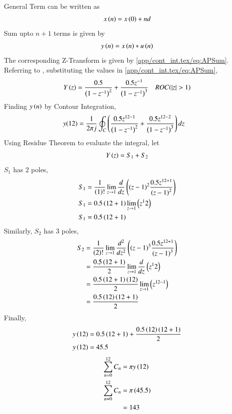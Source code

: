 \documentclass[journal,12pt,twocolumn]{IEEEtran}
\theoremstyle{remark}
\begin{document}
General Term can be written as 
\begin{align}
    x\left(n\right) = x\left(0\right) + nd
\end{align}
Sum upto $n + 1$ terms is given by
\begin{align}
    y\left(n\right) = x\left(n\right)*u\left(n\right)
\end{align}
The corresponding Z-Transform is given by \eqref{app/cont_int.tex/eq:APSum}.
Referring to , substituting the values in \eqref{app/cont_int.tex/eq:APSum}, 
\begin{align}
    Y\left(z\right) = \frac{0.5}{\left(1 - z^{-1}\right)^2} + \frac{0.5z^{-1}}{\left(1-z^{-1}\right)^3} \quad ROC(\left\vert z\right\vert > 1)
\end{align}
Finding $y\left(n\right)$ by Contour Integration, 
\begin{align}
     y(12)&=\frac{1}{2\pi j}\oint_{C}\left(\dfrac{0.5z^{12-1}}{\left(1-z^{-1}\right)^2} + \dfrac{0.5z^{12-2}}{\left(1-z^{-1}\right)^{3}}\right)dz  
\end{align}
Using Residue Theorem to evaluate the integral, let 
\begin{align}
    Y\left(z\right) = S_{1} + S_{2}
\end{align}
$S_{1}$ has 2 poles,
\begin{align}
    S_{1} &= \frac{1}{\left(1\right)!}\lim\limits_{z\to 1}\frac{d}{dz}\left({(z-1)}^{2}\frac{0.5z^{12+1}}{{(z-1)}^2}\right)\\
    S_{1} &= 0.5\left(12+1\right)\lim\limits_{z\to 1}\left(z^12\right)\\
    S_{1} &=0.5\left(12+1\right)
\end{align}
Similarly, $S_{2}$ has 3 poles, 
\begin{align}
    S_{2}&=\frac{1}{\left(2\right)!}\lim\limits_{z\to 1}\frac{d^{2}}{dz^{2}}\left({(z-1)}^{3}\frac{0.5z^{12+1}}{{(z-1)}^3}\right)\\
    &=\frac{0.5\left(12+1\right)}{2}\lim\limits_{z\to 1}\frac{d}{dz}\left(z^12\right)\\
    &=\frac{0.5\left(12+1\right)\left(12\right)}{2}\lim\limits_{z\to 1}\left(z^{12-1}\right)\\
    &=\frac{0.5\left(12\right)\left(12+1\right)}{2}
\end{align}
Finally, 
\begin{align}
    y\left(12\right) &= 0.5\left(12+1\right) + \frac{0.5\left(12\right)\left(12+1\right)}{2}\\
    y\left(12\right) &= 45.5
\end{align}
\begin{align}
    \sum_{n = 0}^{12}C_{n} &= \pi y\left(12\right)\\
    \sum_{n = 0}^{12}C_{n} &= \pi \left(45.5\right)\\
                           &= 143
\end{align}
\end{document}

